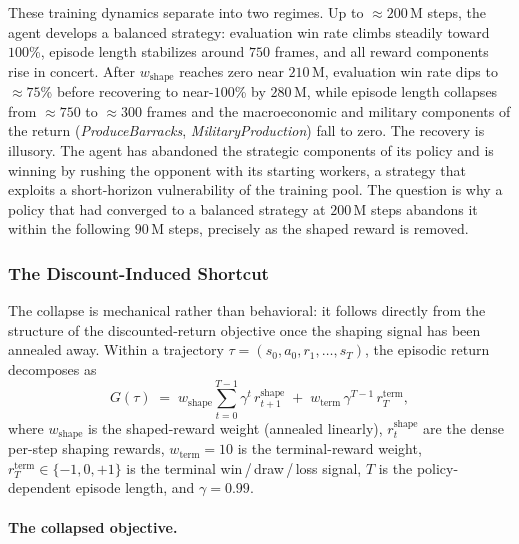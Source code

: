 These training dynamics separate into two regimes. Up to ${\approx}200\,\text{M}$ steps, the agent develops a balanced strategy: evaluation win rate climbs steadily toward $100$\%, episode length stabilizes around $750$ frames, and all reward components rise in concert. After $w_{\text{shape}}$ reaches zero near $210\,\text{M}$, evaluation win rate dips to ${\approx}75$\% before recovering to near-$100$\% by $280\,\text{M}$, while episode length collapses from ${\approx}750$ to ${\approx}300$ frames and the macroeconomic and military components of the return (\textit{ProduceBarracks}, \textit{MilitaryProduction}) fall to zero. The recovery is illusory. The agent has abandoned the strategic components of its policy and is winning by rushing the opponent with its starting workers, a strategy that exploits a short-horizon vulnerability of the training pool. The question is why a policy that had converged to a balanced strategy at $200\,\text{M}$ steps abandons it within the following $90\,\text{M}$ steps, precisely as the shaped reward is removed.

\subsubsection{The Discount-Induced Shortcut}

The collapse is mechanical rather than behavioral: it follows directly from the structure of the discounted-return objective once the shaping signal has been annealed away. Within a trajectory $\tau = (s_0, a_0, r_1, \dots, s_T)$, the episodic return decomposes as
\begin{equation}
G(\tau) \;=\; w_{\text{shape}} \sum_{t=0}^{T-1} \gamma^{t}\, r^{\text{shape}}_{t+1} \;+\; w_{\text{term}}\, \gamma^{T-1}\, r^{\text{term}}_{T},
\label{eq:rush-decomp}
\end{equation}
where $w_{\text{shape}}$ is the shaped-reward weight (annealed linearly), $r^{\text{shape}}_{t}$ are the dense per-step shaping rewards, $w_{\text{term}} = 10$ is the terminal-reward weight, $r^{\text{term}}_{T} \in \{-1, 0, +1\}$ is the terminal win\,/\,draw\,/\,loss signal, $T$ is the policy-dependent episode length, and $\gamma = 0.99$.

\paragraph*{The collapsed objective.}

